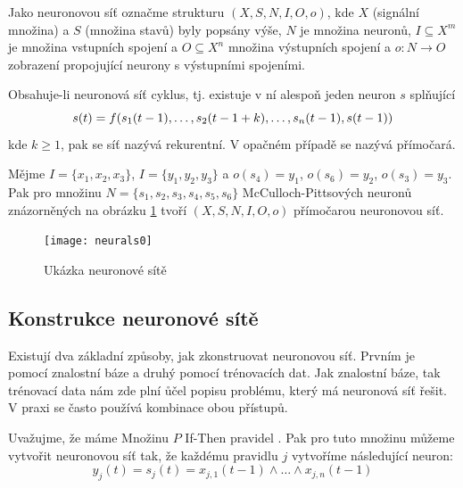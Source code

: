\documentclass[a4paper,10pt]{article}
\begin{document}
\begin{definition}
 Jako neuronovou síť označme strukturu $(X, S, N, I, O, o)$, kde $X$ (signální množina) a  $S$ (množina stavů) byly popsány výše, $N$ je množina neuronů, $I \subseteq X^m$ je množina vstupních spojení a $O \subseteq X^n$ množina výstupních spojení a $o: N \rightarrow O$ zobrazení propojující neurony s výstupními spojeními.
\end{definition}

\begin{definition}
 Obsahuje-li neuronová síť cyklus, tj. existuje v ní alespoň jeden neuron $s$ splňující
 $$
  s(t) = f(s_1(t - 1), \dots, s_2(t - 1 + k), \dots, s_n(t - 1), s(t - 1)) \\
 $$
 kde $k \geq 1$, pak se síť nazývá rekurentní. V opačném případě se nazývá přímočará.
\end{definition}

\begin{example}
 Mějme $I = \{ x_1, x_2, x_3 \}$, $I = \{ y_1, y_2, y_3 \}$ a $o(s_4) = y_1$, $o(s_6) = y_2$, $o(s_3) = y_3$. Pak pro množinu $N = \{ s_1, s_2, s_3, s_4, s_5, s_6 \}$ McCulloch-Pittsových neuronů znázorněných na obrázku \ref{img:SimplNeuNet} tvoří $(X, S, N, I, O, o)$ přímočarou neuronovou síť.
\end{example}

\begin{figure}
 \centering
 \texttt{[image: neurals0]}
 \caption{Ukázka neuronové sítě} \label{img:SimplNeuNet}
\end{figure}

\subsection{Konstrukce neuronové sítě}
Existují dva základní způsoby, jak zkonstruovat neuronovou síť. Prvním je pomocí znalostní báze a druhý pomocí trénovacích dat. Jak znalostní báze, tak trénovací data nám zde plní ůčel popisu problému, který má neuronová síť řešit. V praxi se často používá kombinace obou přístupů.

Uvažujme, že máme Množinu $P$ If-Then pravidel . Pak pro tuto množinu můžeme vytvořit neuronovou síť tak, že každému pravidlu $j$ vytvoříme následující neuron: 
$$
  y_j(t) = s_j(t) = x_{j,1}(t - 1) \wedge \dots \wedge x_{j,n}(t - 1)
$$
\end{document}

